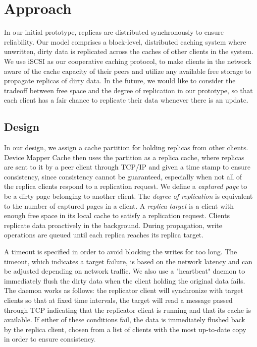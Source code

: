 \section{Approach}
\label{approach}

In our initial prototype, replicas are distributed
synchronously to ensure reliability. Our model comprises a
block-level, distributed caching system where unwritten,
dirty data is replicated across the caches of other
clients in the system. We use iSCSI as our cooperative
caching protocol, to make clients in the network aware of
the cache capacity of their peers and utilize any available
free storage to propagate replicas of dirty data. In the
future, we would
like to consider the tradeoff between free space and the
degree of replication in our prototype, so that each client
has a fair chance to replicate their data whenever there is
an update.


\subsection{Design}

In our design, we assign a cache partition for holding
replicas from other clients. Device Mapper Cache then
uses the partition as a replica cache, where replicas
are sent to it by a peer client through TCP/IP and given
a time stamp to ensure consistency, since consistency
cannot be guaranteed, especially when not all of the
replica clients respond to a 
replication request.
We define a \textit{captured page} to be
a dirty page belonging to another client. The
\textit{degree of replication} is equivalent to the number
of captured pages in a client. A
\textit{replica target} is a client with enough
free space in its local cache to satisfy
a replication request. Clients replicate data proactively
in the background. During propagation, write
operations are queued until each replica reaches its
replica target.

A timeout is specified in order to
avoid blocking the writes for too long. The timeout, which
indicates a target failure, is based on the network
latency and can be adjusted depending on network traffic.
We also use a "heartbeat" daemon to immediately flush the
dirty data when the client holding the original data fails.
The daemon works as follows: the replicator client will
synchronize with target clients so that at fixed time
intervals, the target will read a message passed through
TCP indicating that the replicator client is running and that
its cache is available. If either of these conditions fail,
the data is immediately flushed back by the replica client,
chosen from a list of clients with the most up-to-date copy
in order to ensure consistency.

